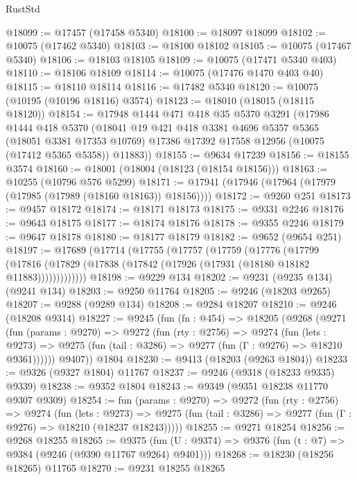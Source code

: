 \begin{lexlean}{RustStd}
\begin{coremodule}
@18099 := @17457 (@17458 @5340)
@18100 := @18097 @18099
@18102 := @10075 (@17462 @5340)
@18103 := @18100 @18102
@18105 := @10075 (@17467 @5340)
@18106 := @18103 @18105
@18109 := @10075 (@17471 @5340 @403)
@18110 := @18106 @18109
@18114 := @10075 (@17476 @1470 @403 @40)
@18115 := @18110 @18114
@18116 := @17482 @5340
@18120 := @10075 (@10195 (@10196 @18116) @3574)
@18123 := @18010 (@18015 (@18115 @18120))
@18154 := @17948
    @1444
    @471
    @418
    @35
    @5370
    @3291
    (@17986
      @1444
      @418
      @5370
      (@18041
        @19
        @421
        @418
        @3381
        @4696
        @5357
        @5365
        (@18051 @3381 @17353 @10769)
        @17386
        @17392
        @17558
        @12956
        (@10075 (@17412 @5365 @5358))
        @11883))
@18155 := @9634 @17239
@18156 := @18155 @3574
@18160 := @18001 (@18004 (@18123 (@18154 @18156)))
@18163 := @10255 (@10796 @576 @5299)
@18171 := @17941 (@17946 (@17964 (@17979 (@17985 (@17989 (@18160 @18163)) @18156))))
@18172 := @9260 @251
@18173 := @9457 @18172
@18174 := @18171 @18173
@18175 := @9331 @2246
@18176 := @9643 @18175
@18177 := @18174 @18176
@18178 := @9355 @2246
@18179 := @9647 @18178
@18180 := @18177 @18179
@18182 := @9652 (@9654 @251)
@18197 := @17689
    (@17714
      (@17755
        (@17757
          (@17759
            (@17776
              (@17799
                (@17816 (@17829 (@17838 (@17842 (@17926 (@17931 (@18180 @18182 @11883)))))))))))))
@18198 := @9229 @134
@18202 := @9231 (@9235 @134) (@9241 @134)
@18203 := @9250 @11764
@18205 := @9246 (@18203 @9265)
@18207 := @9288 (@9289 @134)
@18208 := @9284 @18207
@18210 := @9246 (@18208 @9314)
@18227 := @9245
    (fun (fn : @454) =>
    @18205
      (@9268
        (@9271
          (fun (params : @9270) =>
          @9272
            (fun (rty : @2756) =>
            @9274
              (fun (lets : @9273) =>
              @9275 (fun (tail : @3286) => @9277 (fun (Γ : @9276) => @18210 @9361))))))
        @9407))
    @1804
@18230 := @9413 (@18203 (@9263 @1804))
@18233 := @9326 (@9327 @1804) @11767
@18237 := @9246 (@9318 (@18233 @9335) @9339)
@18238 := @9352 @1804
@18243 := @9349 (@9351 @18238 @11770 @9307 @9309)
@18254 := fun (params : @9270) =>
  @9272
    (fun (rty : @2756) =>
    @9274
      (fun (lets : @9273) =>
      @9275 (fun (tail : @3286) => @9277 (fun (Γ : @9276) => @18210 (@18237 @18243)))))
@18255 := @9271 @18254
@18256 := @9268 @18255
@18265 := @9375
    (fun (U : @9374) => @9376 (fun (t : @7) => @9384 (@9246 (@9390 @11767 @9264) @9401)))
@18268 := @18230 (@18256 @18265) @11765
@18270 := @9231 @18255 @18265

\end{coremodule}
\end{lexlean}
